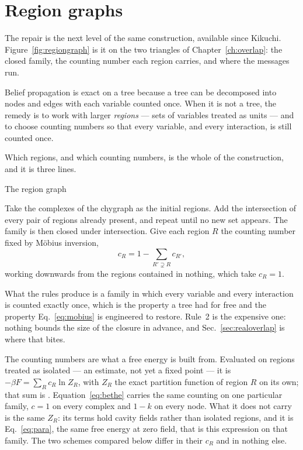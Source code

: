 \section{Region graphs}
\label{sec:regions}

The repair is the next level of the same construction, available since
Kikuchi. Figure~\ref{fig:regiongraph} is it on the two triangles of
Chapter~\ref{ch:overlap}: the closed family, the counting number each region
carries, and where the messages run.

Belief propagation is exact on a tree because a tree can be decomposed into
nodes and edges with each variable counted once. When it is not a tree, the
remedy is to work with larger \emph{regions} --- sets of variables treated as
units --- and to choose counting numbers so that every variable, and every
interaction, is still counted once.

Which regions, and which counting numbers, is the whole of the construction, and
it is three lines.

\begin{model}{The region graph}
\begin{rules}
 Take the complexes of the chygraph as the initial regions.
 Add the intersection of every pair of regions already present, and
repeat until no new set appears. The family is then closed under intersection.
 Give each region $R$ the counting number fixed by M\"obius
inversion,
\begin{equation}
  c_{R}=1-\sum_{R'\supsetneq R}c_{R'},
  \label{eq:mobius}
\end{equation}
working downwards from the regions contained in nothing, which take $c_{R}=1$.
\end{rules}
\end{model}

What the rules produce is a family in which every variable and every interaction
is counted exactly once, which is the property a tree had for free and the
property Eq.~\eqref{eq:mobius} is engineered to restore. Rule~2 is the expensive
one: nothing bounds the size of the closure in advance, and
Sec.~\ref{sec:realoverlap} is where that bites.

The counting numbers are what a free energy is built from. Evaluated on regions
treated as isolated --- an estimate, not yet a fixed point --- it is
$-\beta F=\sum_{R}c_{R}\ln Z_{R}$, with $Z_{R}$ the exact partition function of
region $R$ on its own; that sum is
.
Equation~\eqref{eq:bethe} carries the same counting on one particular family,
$c=1$ on every complex and $1-k$ on every node. What it does not carry is the
same $Z_{R}$: its terms hold cavity fields rather than isolated regions, and it
is Eq.~\eqref{eq:para}, the same free energy at zero field, that is this
expression on that family. The two schemes compared below differ in their
$c_{R}$ and in nothing else.

